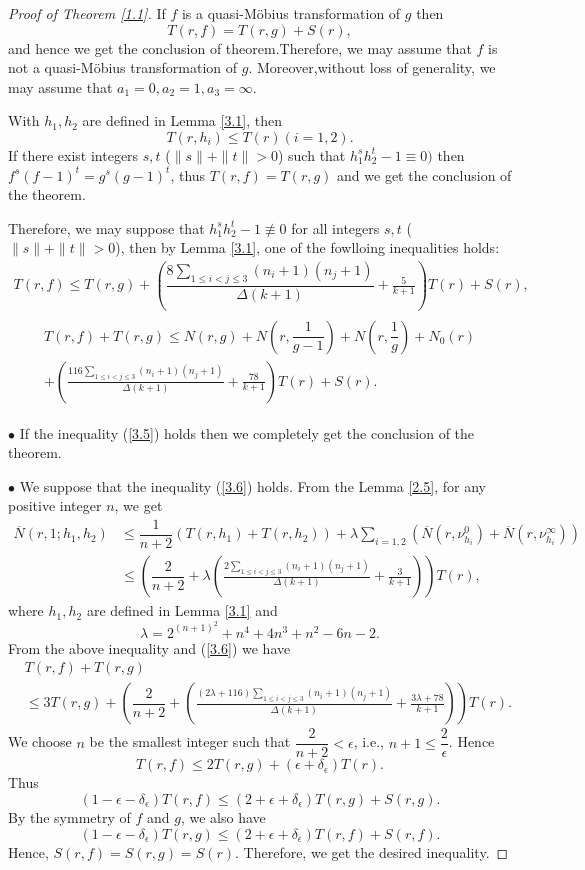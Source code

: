 \documentclass[12pt,leqno]{amsart}
\numberwithin{equation}{section}
\begin{document}
\begin{proof}[Proof of Theorem \ref{1.1}] If $f$ is a quasi-M\"{o}bius transformation of $g$ then 
$$T(r, f)=T(r, g)+S(r),$$ 
and hence we get the conclusion of theorem.Therefore, we may assume that $f$ is not a quasi-M\"{o}bius transformation of $g$. Moreover,without loss of generality, we may assume that $a_1=0, a_2=1, a_3=\infty$. 

With $h_1, h_2$ are defined in Lemma \ref{3.1}, then 
$$T(r, h_i)\le T(r)(i=1,2).$$ 
If there exist integers $s, t$ ($\|s\|+\|t\|>0$) such that $h_1^sh_2^t-1\equiv 0)$ then $f^s(f-1)^t=g^s(g-1)^t$, thus $T(r,f)=T(r,g)$ and we get the conclusion of the theorem.

Therefore, we may suppose that $h_1^sh_2^t-1\not\equiv 0$ for all integers $s, t$ ($\|s\|+\|t\|>0$), then by Lemma \ref{3.1}, one of the fowlloing inequalities holds:
\begin{align}\label{3.5}
    T(r,f)\le T(r,g)+\left(\dfrac{8\sum_{1\le i<j\le 3}(n_i+1)(n_j+1)}{\Delta(k+1)}+\frac{5}{k+1}\right)T(r) +S(r),
\end{align}
\begin{align}\label{3.6}
\begin{split}
    T(r, f)+T(r, g)\le N(r,g)+N\left(r, \dfrac{1}{g-1}\right) +N\left(r, \dfrac{1}{g}\right)+N_0(r)\\
    +\left(\frac{116\sum_{1\le i<j\le 3}(n_i+1)(n_j+1)}{\Delta(k+1)}+\frac{78}{k+1}\right)T(r)+ S(r).
\end{split} 
\end{align}

$\bullet$ If the inequality (\ref{3.5}) holds then we completely get the conclusion of the theorem.

$\bullet$ We suppose that the inequality (\ref{3.6}) holds. From the Lemma \ref{2.5}, for any positive integer $n$, we get
\begin{align*}
    \overline N(r,1;h_1,h_2)&\leq \dfrac{1}{n+2}\left(T(r,h_1)+T(r, h_2)\right) +\lambda\sum_{i=1,2}\left(\overline N(r,\nu^0_{h_i})+\overline N(r,\nu^\infty_{h_i})\right)\\
    & \le \left (\dfrac{2}{n+2}+\lambda\left(\frac{2\sum_{1\le i<j\le 3}(n_i+1)(n_j+1)}{\Delta(k+1)}+\frac{3}{k+1}\right) \right)T(r),
\end{align*}
where $h_1, h_2$ are defined in Lemma \ref{3.1} and 
$$\lambda=2^{(n+1)^2}+n^4+4n^3+n^2-6n-2.$$
From the above inequality and  (\ref{3.6}) we have
\begin{align*}
&T(r,f)+T(r,g)\\&
\le 3T(r,g)+\left (\dfrac{2}{n+2}+\left(\frac{(2\lambda+116)\sum_{1\le i<j\le 3}(n_i+1)(n_j+1)}{\Delta(k+1)}+\frac{3\lambda+78}{k+1}\right) \right)T(r).
\end{align*}
We choose $n$ be the smallest integer  such that $\dfrac{2}{n+2}<\epsilon$, i.e., $n+1\leq \dfrac{2}{\epsilon}$. Hence
$$T(r,f)\le 2T(r,g)+\left (\epsilon+\delta_\epsilon\right) T(r).$$
Thus
$$(1-\epsilon-\delta_\epsilon)T(r, f)\le (2+\epsilon +\delta_\epsilon )T(r, g)+S(r, g).$$
By the symmetry of $f$ and $g$, we also have
$$(1-\epsilon-\delta_\epsilon)T(r, g)\le (2+\epsilon +\delta_\epsilon )T(r, f)+S(r, f).$$
Hence, $S(r,f)=S(r,g)=S(r)$. Therefore, we get the desired inequality. 


\end{proof}
\end{document}
